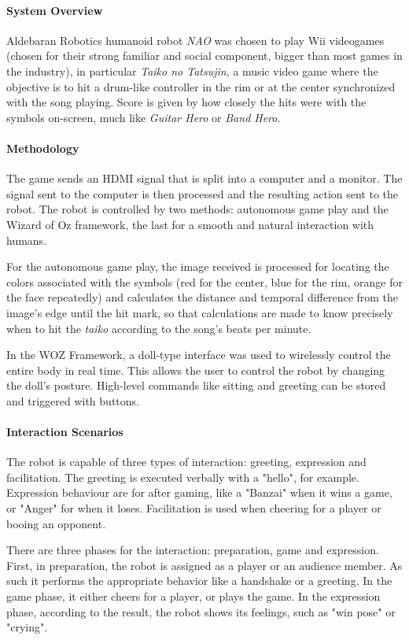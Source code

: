 \documentclass[runningheads]{llncs}
\begin{document}
\paragraph{System Overview} Aldebaran Robotics humanoid robot \textit{NAO} was chosen to play Wii videogames (chosen for their strong familiar and social component, bigger than most games in the industry), in particular \textit{Taiko no Tatsujin}, a music video game where the objective is to hit a drum-like controller in the rim or at the center synchronized with the song playing. Score is given by how closely the hits were with the symbols on-screen, much like \textit{Guitar Hero} or \textit{Band Hero}.

\paragraph{Methodology} The game sends an HDMI signal that is split into a computer and a monitor. The signal sent to the computer is then processed and the resulting action sent to the robot. The robot is controlled by two methods: autonomous game play and the Wizard of Oz framework, the last for a smooth and natural interaction with humans.
\par For the autonomous game play, the image received is processed for locating the colors associated with the symbols (red for the center, blue for the rim, orange for the face repeatedly) and calculates the distance and temporal difference from the image's edge until the hit mark, so that calculations are made to know precisely when to hit the \textit{taiko} according to the song's beats per minute.
\par In the WOZ Framework, a doll-type interface was used to wirelessly control the entire body in real time. This allows the user to control the robot by changing the doll's posture. High-level commands like sitting and greeting can be stored and triggered with buttons.

\paragraph{Interaction Scenarios} The robot is capable of three types of interaction: greeting, expression and facilitation. The greeting is executed verbally with a "hello", for example. Expression behaviour are for after gaming, like a "Banzai" when it wins a game, or "Anger" for when it loses. Facilitation is used when cheering for a player or booing an opponent.
\par There are three phases for the interaction: preparation, game and expression. First, in preparation, the robot is assigned as a player or an audience member. As such it performs the appropriate behavior like a handshake or a greeting. In the game phase, it either cheers for a player, or plays the game. In the expression phase, according to the result, the robot shows its feelings, such as "win pose" or "crying".
\end{document}
